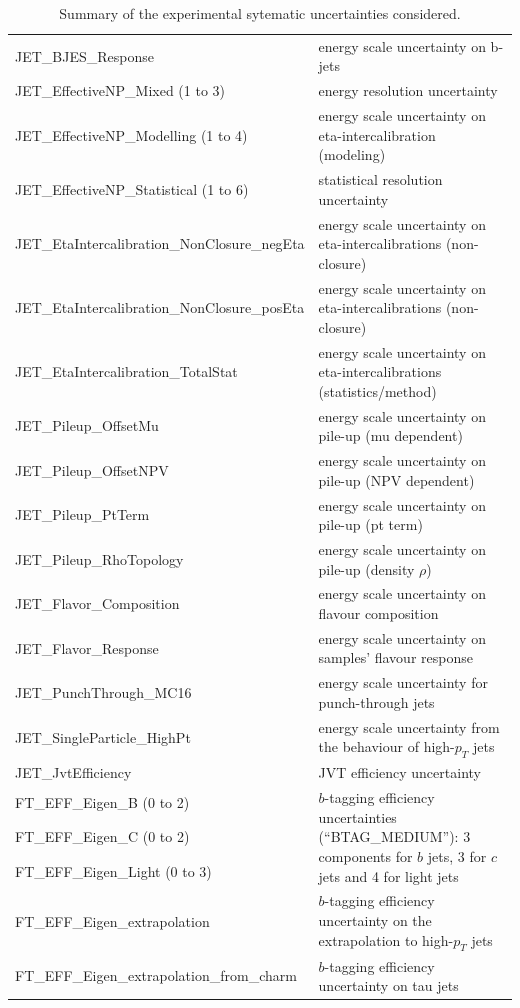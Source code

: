 \begin{table}
{\begin{tabular}{l|l}
  JET\_BJES\_Response & energy scale uncertainty on b-jets \\
  JET\_EffectiveNP\_Mixed (1 to 3) & energy resolution uncertainty \\
  JET\_EffectiveNP\_Modelling (1 to 4) &  energy scale uncertainty on eta-intercalibration (modeling) \\
  JET\_EffectiveNP\_Statistical (1 to 6) &  statistical resolution uncertainty \\
  JET\_EtaIntercalibration\_NonClosure\_negEta &  energy scale uncertainty on eta-intercalibrations (non-closure) \\
  JET\_EtaIntercalibration\_NonClosure\_posEta & energy scale uncertainty on eta-intercalibrations (non-closure) \\
  JET\_EtaIntercalibration\_TotalStat & energy scale uncertainty on eta-intercalibrations (statistics/method) \\
  JET\_Pileup\_OffsetMu                & energy scale uncertainty on pile-up (mu dependent)    \\
  JET\_Pileup\_OffsetNPV               & energy scale uncertainty on pile-up (NPV dependent)   \\
  JET\_Pileup\_PtTerm                  & energy scale uncertainty on pile-up (pt term)         \\
  JET\_Pileup\_RhoTopology             & energy scale uncertainty on pile-up (density $\rho$)  \\
  JET\_Flavor\_Composition             & energy scale uncertainty on flavour composition       \\
  JET\_Flavor\_Response                & energy scale uncertainty on samples' flavour response \\
  JET\_PunchThrough\_MC16              & energy scale uncertainty for punch-through jets       \\
  JET\_SingleParticle\_HighPt          & energy scale uncertainty from the behaviour of high-$p_T$ jets \\
  JET\_JvtEfficiency & JVT efficiency uncertainty      \\
  FT\_EFF\_Eigen\_B (0 to 2) & \multirow{3}{*}{\parbox{11cm}{$b$-tagging efficiency uncertainties (``BTAG\_MEDIUM''): 3 components for $b$ jets, 3 for $c$ jets and 4 for light jets}} \\
  FT\_EFF\_Eigen\_C (0 to 2)                 & \\
  FT\_EFF\_Eigen\_Light (0 to 3)             & \\
  FT\_EFF\_Eigen\_extrapolation              & $b$-tagging efficiency uncertainty on the extrapolation to high-$p_T$ jets\\
  FT\_EFF\_Eigen\_extrapolation\_from\_charm & $b$-tagging efficiency uncertainty on tau jets \\
\hline\hline     
\end{tabular}
}
\caption{Summary of the experimental sytematic uncertainties considered.}
\label{tab:expSyst}
\end{table}
